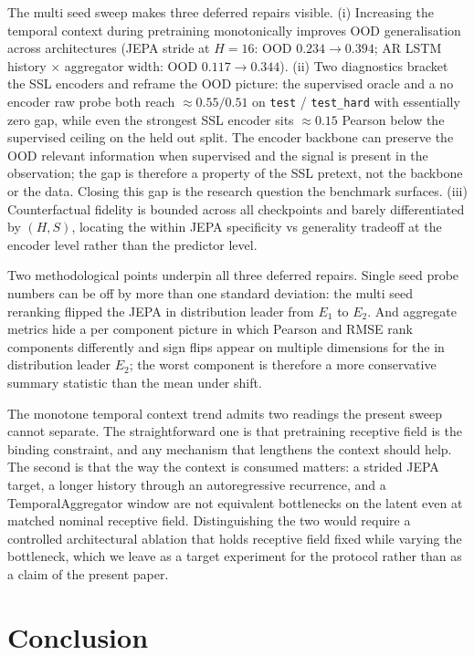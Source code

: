 \documentclass{article}
\begin{document}
The multi seed sweep makes three deferred repairs visible. (i) Increasing the temporal context during pretraining monotonically improves OOD generalisation across architectures (JEPA stride at $H{=}16$: OOD $0.234 \to 0.394$; AR LSTM history $\times$ aggregator width: OOD $0.117 \to 0.344$). (ii) Two diagnostics bracket the SSL encoders and reframe the OOD picture: the supervised oracle and a no encoder raw probe both reach $\approx 0.55 / 0.51$ on \texttt{test} / \texttt{test\_hard} with essentially zero gap, while even the strongest SSL encoder sits $\approx 0.15$ Pearson below the supervised ceiling on the held out split. The encoder backbone can preserve the OOD relevant information when supervised and the signal is present in the observation; the gap is therefore a property of the SSL pretext, not the backbone or the data. Closing this gap is the research question the benchmark surfaces. (iii) Counterfactual fidelity is bounded across all checkpoints and barely differentiated by $(H, S)$, locating the within JEPA specificity vs generality tradeoff at the encoder level rather than the predictor level.

Two methodological points underpin all three deferred repairs. Single seed probe numbers can be off by more than one standard deviation: the multi seed reranking flipped the JEPA in distribution leader from $E_1$ to $E_2$. And aggregate metrics hide a per component picture in which Pearson and RMSE rank components differently and sign flips appear on multiple dimensions for the in distribution leader $E_2$; the worst component is therefore a more conservative summary statistic than the mean under shift.

The monotone temporal context trend admits two readings the present sweep cannot separate. The straightforward one is that pretraining receptive field is the binding constraint, and any mechanism that lengthens the context should help. The second is that the way the context is consumed matters: a strided JEPA target, a longer history through an autoregressive recurrence, and a TemporalAggregator window are not equivalent bottlenecks on the latent even at matched nominal receptive field. Distinguishing the two would require a controlled architectural ablation that holds receptive field fixed while varying the bottleneck, which we leave as a target experiment for the protocol rather than as a claim of the present paper.

\section{Conclusion}
\label{sec:conclusion}
\end{document}
